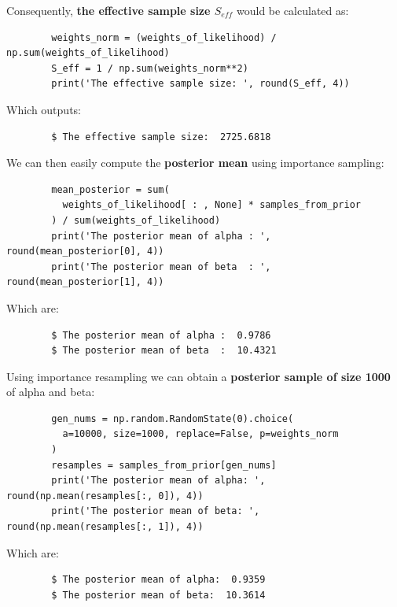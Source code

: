 \documentclass[11pt,a4paper,english]{article}
\begin{document}
      Consequently, \textbf{the effective sample size $S_{eff}$} would be calculated as:
      \begin{verbatim}
        weights_norm = (weights_of_likelihood) / np.sum(weights_of_likelihood)
        S_eff = 1 / np.sum(weights_norm**2)
        print('The effective sample size: ', round(S_eff, 4))
      \end{verbatim}

      Which outputs:
      \begin{verbatim}
        $ The effective sample size:  2725.6818
      \end{verbatim}

      We can then easily compute the \textbf{posterior mean} using importance sampling:
      \begin{verbatim}
        mean_posterior = sum(
          weights_of_likelihood[ : , None] * samples_from_prior
        ) / sum(weights_of_likelihood)
        print('The posterior mean of alpha : ', round(mean_posterior[0], 4))
        print('The posterior mean of beta  : ', round(mean_posterior[1], 4))
      \end{verbatim}

      Which are:
      \begin{verbatim}
        $ The posterior mean of alpha :  0.9786
        $ The posterior mean of beta  :  10.4321
      \end{verbatim}

      Using importance resampling we can obtain a \textbf{posterior sample of size 1000} of alpha and beta:
      \begin{verbatim}
        gen_nums = np.random.RandomState(0).choice(
          a=10000, size=1000, replace=False, p=weights_norm
        )
        resamples = samples_from_prior[gen_nums]
        print('The posterior mean of alpha: ', round(np.mean(resamples[:, 0]), 4))
        print('The posterior mean of beta: ', round(np.mean(resamples[:, 1]), 4))
      \end{verbatim}

      Which are:
      \begin{verbatim}
        $ The posterior mean of alpha:  0.9359
        $ The posterior mean of beta:  10.3614
      \end{verbatim}
\end{document}
